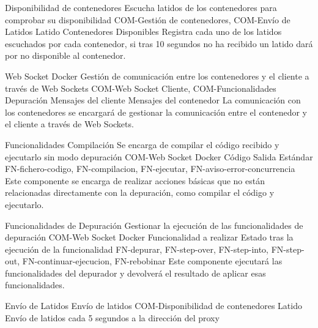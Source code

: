 \begin{component}{Disponibilidad de contenedores}
{Escucha latidos de los contenedores para comprobar su disponibilidad }
{COM-Gestión de contenedores, COM-Envío de Latidos} %
{Latido} %
{Contenedores Disponibles} %
{\NA} %
Registra cada uno de los latidos escuchados por cada contenedor, si tras 10 segundos no ha recibido un latido dará por no disponible al contenedor. %
\end{component}


\begin{component}{Web Socket Docker}
{Gestión de comunicación entre los contenedores y el cliente a través de Web Sockets}
{COM-Web Socket Cliente, COM-Funcionalidades Depuración} %
{Mensajes del cliente} %
{Mensajes del contenedor} %
{\NA} %
La comunicación con los contenedores se encargará de gestionar la comunicación entre el contenedor y el cliente a través de Web Sockets. %
\end{component}

\begin{component}{Funcionalidades Compilación}
{Se encarga de compilar el código recibido y ejecutarlo sin modo depuración}
{COM-Web Socket Docker}
{Código}
{Salida Estándar}
{FN-fichero-codigo, FN-compilacion, FN-ejecutar, FN-aviso-error-concurrencia}
Este componente se encarga de realizar acciones básicas que no están relacionadas directamente con la depuración, como compilar el código y ejecutarlo.
\end{component}

\begin{component}{Funcionalidades de Depuración}
{Gestionar la ejecución de las funcionalidades de depuración}
{COM-Web Socket Docker} %
{Funcionalidad a realizar} %
{Estado tras la ejecución de la funcionalidad} %
{FN-depurar, FN-step-over, FN-step-into, FN-step-out, FN-continuar-ejecucion, FN-rebobinar} %
Este componente ejecutará las funcionalidades del depurador y devolverá el resultado de aplicar esas funcionalidades. %
\end{component}

\begin{component}{Envío de Latidos}
{Envío de latidos}
{COM-Disponibilidad de contenedores} %
{\NA} %
{Latido} %
{\NA} %
Envío de latidos cada 5 segundos a la dirección del proxy
\end{component}

